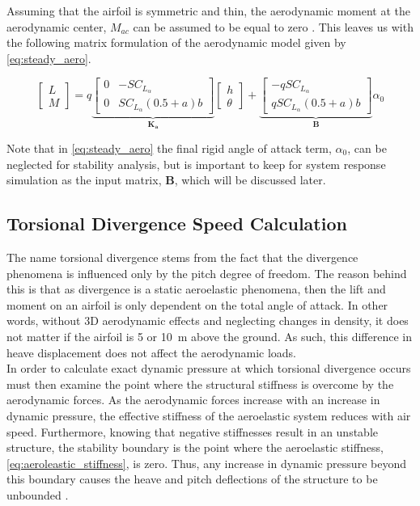 Assuming that the airfoil is symmetric and thin, the aerodynamic moment at the
aerodynamic center, $M_{ac}$ can be assumed to be equal to zero
\autocite[p.5]{kelleyThinAirfoilTheory2016}. This leaves us with the following
matrix formulation of the aerodynamic model given by \cref{eq:steady_aero}.

\begin{equation}
    \label{eq:steady_aero}
    \begin{bmatrix}
        L \\ M
    \end{bmatrix} =
    q\underbrace{\begin{bmatrix}
        0 & -S C_{L_\alpha} \\
        0 & S C_{L_\alpha}\left(0.5 + a\right)b
    \end{bmatrix}}_{\bm{K_a}}
    \begin{bmatrix}
        h \\ \theta
    \end{bmatrix} +
    \underbrace{\begin{bmatrix}
        -qS C_{L_\alpha} \\
        qS C_{L_\alpha}\left(0.5 + a\right)b
    \end{bmatrix}}_{\bm{B}} \alpha_0
\end{equation}

Note that in \cref{eq:steady_aero} the final rigid angle of attack term,
$\alpha_0$, can be neglected for stability analysis, but is important to keep
for system response simulation as the input matrix, $\bm{B}$, which will be
discussed later.

\subsection{Torsional Divergence Speed Calculation}
The name torsional divergence stems from the fact that the divergence phenomena
is influenced only by the pitch degree of freedom. The reason behind this is
that as divergence is a static aeroelastic phenomena, then the lift and moment
on an airfoil is only dependent on the total angle of attack. In other words,
without 3D aerodynamic effects and neglecting changes in density, it does not
matter if the airfoil is 5 or \SI{10}{\meter} above the ground. As such, this
difference in heave displacement does not affect the aerodynamic loads.\\

In order to calculate exact dynamic pressure at which torsional divergence
occurs must then examine the point where the structural stiffness is overcome
by the aerodynamic forces. As the aerodynamic forces increase with an increase
in dynamic pressure, the effective stiffness of the aeroelastic system
reduces with air speed. Furthermore, knowing that negative stiffnesses result
in an unstable structure, the stability boundary is the point where the
aeroelastic stiffness, \cref{eq:aeroleastic_stiffness}, is zero. Thus, any
increase in dynamic pressure beyond this boundary causes the heave and
pitch deflections of the structure to be unbounded
\autocite[p.26]{hulshoffAE4930AeroelasticityCourse2011}.


